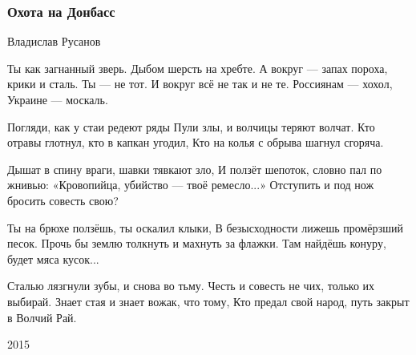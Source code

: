  
 
 

\subsubsection{Охота на Донбасс}

Владислав Русанов

Ты как загнанный зверь. Дыбом шерсть на хребте.
А вокруг — запах пороха, крики и сталь.
Ты — не тот. И вокруг всё не так и не те.
Россиянам — хохол, Украине — москаль.

Погляди, как у стаи редеют ряды
Пули злы, и волчицы теряют волчат.
Кто отравы глотнул, кто в капкан угодил,
Кто на колья с обрыва шагнул сгоряча.

Дышат в спину враги, шавки тявкают зло,
И ползёт шепоток, словно пал по жнивью:
«Кровопийца, убийство — твоё ремесло...»
Отступить и под нож бросить совесть свою?

Ты на брюхе ползёшь, ты оскалил клыки,
В безысходности лижешь промёрзший песок.
Прочь бы землю толкнуть и махнуть за флажки.
Там найдёшь конуру, будет мяса кусок...

Сталью лязгнули зубы, и снова во тьму.
Честь и совесть не чих, только их выбирай.
Знает стая и знает вожак, что тому,
Кто предал свой народ, путь закрыт в Волчий Рай.

2015
